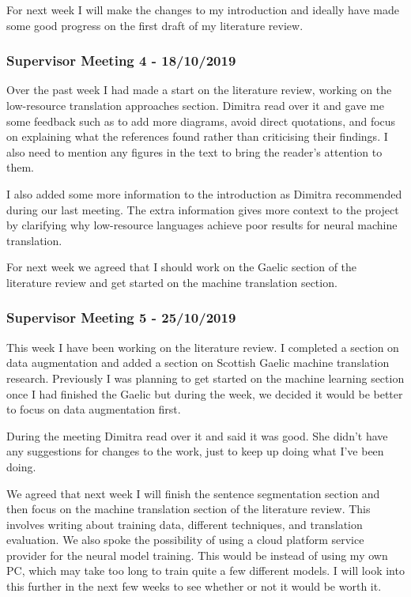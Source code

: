 For next week I will make the changes to my introduction and ideally have made some good progress on the first draft of my literature review. 

\subsubsection{Supervisor Meeting 4 - 18/10/2019}
Over the past week I had made a start on the literature review, working on the low-resource translation approaches section. Dimitra read over it and gave me some feedback such as to add more diagrams, avoid direct quotations, and focus on explaining what the references found rather than criticising their findings. I also need to mention any figures in the text to bring the reader’s attention to them.

I also added some more information to the introduction as Dimitra recommended during our last meeting. The extra information gives more context to the project by clarifying why low-resource languages achieve poor results for neural machine translation. 

For next week we agreed that I should work on the Gaelic section of the literature review and get started on the machine translation section.

\subsubsection{Supervisor Meeting 5 - 25/10/2019}
This week I have been working on the literature review. I completed a section on data augmentation and added a section on Scottish Gaelic machine translation research. Previously I was planning to get started on the machine learning section once I had finished the Gaelic but during the week, we decided it would be better to focus on data augmentation first.

During the meeting Dimitra read over it and said it was good. She didn’t have any suggestions for changes to the work, just to keep up doing what I’ve been doing. 

We agreed that next week I will finish the sentence segmentation section and then focus on the machine translation section of the literature review. This involves writing about training data, different techniques, and translation evaluation.
We also spoke the possibility of using a cloud platform service provider for the neural model training. This would be instead of using my own PC, which may take too long to train quite a few different models. I will look into this further in the next few weeks to see whether or not it would be worth it.


